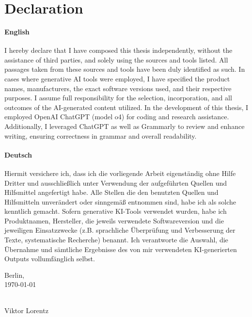 \chapter*{Declaration}
\thispagestyle{empty}
\subsubsection{English}
I hereby declare that I have composed this thesis independently, without the assistance of third parties, and solely using the sources and tools listed. All passages taken from these sources and tools have been duly identified as such.
In cases where generative AI tools were employed, I have specified the product names, manufacturers, the exact software versions used, and their respective purposes. I assume full responsibility for the selection, incorporation, and all outcomes of the AI-generated content utilized.
In the development of this thesis, I employed OpenAI ChatGPT (model o4) for coding and research assistance. Additionally, I leveraged ChatGPT as well as Grammarly to review and enhance writing, ensuring correctness in grammar and overall readability. 
\subsubsection{Deutsch}
Hiermit versichere ich, dass ich die vorliegende Arbeit eigenständig ohne Hilfe Dritter und ausschließlich unter Verwendung der aufgeführten Quellen und Hilfsmittel angefertigt habe. Alle Stellen die den benutzten Quellen und Hilfsmitteln unverändert oder sinngemäß entnommen sind, habe ich als solche kenntlich gemacht.
Sofern generative KI-Tools verwendet wurden, habe ich Produktnamen, Hersteller, die jeweils verwendete Softwareversion und die jeweiligen Einsatzzwecke (z.B. sprachliche Überprüfung und Verbesserung der Texte, systematische Recherche) benannt. Ich verantworte die Auswahl, die Übernahme und sämtliche Ergebnisse des von mir verwendeten KI-generierten Outputs vollumfänglich selbst.
\vspace{3cm}
\noindent{}

Berlin, \\\today
\begin{minipage}[t]{8cm}
\centering \hspace{20mm} \hrulefill \\


\hspace{20mm}Viktor Lorentz
\end{minipage}